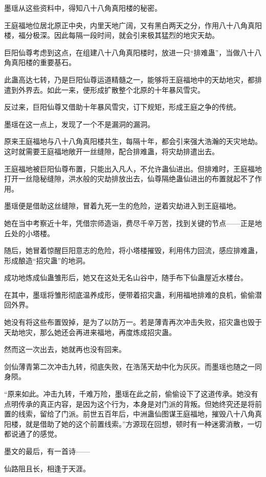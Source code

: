 \begin{this_body}
墨瑶从这些资料中，得知八十八角真阳楼的秘密。

王庭福地位居北原正中央，内里天地广阔，又有黑白两天之分，作用八十八角真阳楼，福分极深。因此每隔一段时间，就会引来极其猛烈的地灾天劫。

巨阳仙尊考虑到这点，在组建八十八角真阳楼时，放进一只“排难蛊”，当做八十八角真阳楼的重要基石。

此蛊高达七转，乃是巨阳仙尊运道精髓之一，能够将王庭福地中的天劫地灾，都排遣到外界去。如此一来，便形成扩散整个北原的十年暴风雪灾。

反过来，巨阳仙尊又借助十年暴风雪灾，订下规矩，形成王庭之争的传统。

墨瑶在这一点上，发现了一个不是漏洞的漏洞。

原来王庭福地与八十八角真阳楼共生，每隔十年，都会引来强大浩瀚的天灾地劫。这时就需要王庭福地敞开一丝缝隙，配合排难蛊，将灾劫排遣出去。

王庭福地被巨阳仙尊布置，只能出入凡人，不允许蛊仙进出。但排难时，王庭福地打开一丝隐秘缝隙，洪水般的灾劫排放出去，仙尊隔绝蛊仙进出的布置就起不了作用。

墨瑶便是借助这丝缝隙，冒着九死一生的危险，逆着灾劫进入到王庭福地。

她在当中考察近十年，凭借宗师造诣，费尽千辛万苦，找到关键的节点——正是地丘处的小塔楼。

随后，她冒着惊醒巨阳意志的危险，将小塔楼摧毁，利用伟力回流，感应排难蛊，形成酿造“招灾蛊”的地洞。

成功地炼成仙蛊雏形后，她又在这处无名山谷中，随手布下仙蛊屋近水楼台。

在其中，墨瑶将雏形彻底温养成形，便带着招灾蛊，利用福地排难的良机，偷偷潜回外界。

她没有将这些布置毁掉，是为了以防万一。若是薄青再次冲击失败，招灾蛊也毁于天劫地灾，那么她还会再进来福地，再度炼成招灾蛊。

然而这一次出去，她就再也没有回来。

剑仙薄青第二次冲击九转，彻底失败，在浩荡天劫中化为灰灰。而墨瑶也随之一同身陨。

“原来如此。冲击九转，千难万险，墨瑶在此之前，偷偷设下了这道传承。她没有点明传承的真正内容，是因为这个行为，本身是对门派的背叛。但她终究还是将前置的线索，留给了门派。前世五百年后，中洲蛊仙图谋王庭福地，摧毁八十八角真阳楼，就是借助了她的这个前置线索。”方源现在回想，顿时有一种迷雾消散，一切都说通了的感觉。

墨文的最后，有一首诗——

仙路阻且长，相逢于天涯。


\end{this_body}
